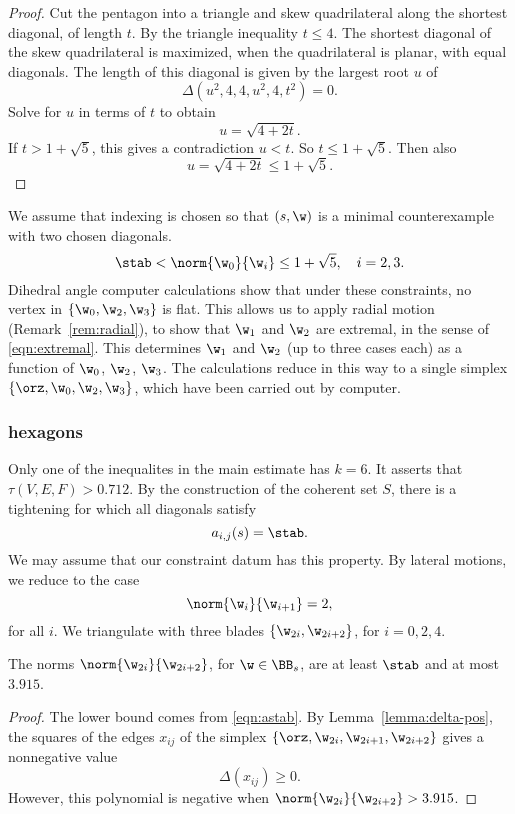 \begin{proof}
  Cut the pentagon into a triangle and skew quadrilateral along the
  shortest diagonal, of length $t$.  By the triangle inequality
  $t\le4$.  The shortest diagonal of the skew quadrilateral is
  maximized, when the quadrilateral is planar, with equal diagonals.
  The length of this diagonal is given by the largest root $u$ of
\[
\Delta(u^2,4,4,u^2,4,t^2)=0.
\]
Solve for $u$ in terms of $t$ to obtain
\[
u = \sqrt{4 + 2 t}.
\]
If $t>1+\sqrt{5}$, this gives a contradiction $u<t$.  
So $t\le 1+\sqrt{5}$.
Then also
\[
u = \sqrt{4 + 2t} \le 1+\sqrt{5}.
\]
\end{proof}


We assume that indexing is chosen so that $(s,\w)$ is a minimal
counterexample with two chosen diagonals.
\[
\stab < \norm{\w_0}{\w_i} \le 1+\sqrt{5},\quad i=2,3.
\]
Dihedral angle computer calculations show that under these
constraints, no vertex in $\{\w_0,\w_2,\w_3\}$ is flat.  This allows
us to apply radial motion (Remark~\ref{rem:radial}), to show that
$\w_1$ and $\w_2$ are extremal, in the sense of \eqref{eqn:extremal}.
This determines $\w_1$ and $\w_2$ (up to three cases each) as a
function of $\w_0$, $\w_2$, $\w_3$.  The calculations reduce in this
way to a single simplex $\{\orz,\w_0,\w_2,\w_3\}$, which have been
carried out by computer.

\subsubsection{hexagons}

Only one of the inequalites in the main estimate has $k=6$.  It
asserts that $\tau(V,E,F) > 0.712$.  By the construction of the
coherent set $S$, there is a tightening for which all diagonals
satisfy
\begin{equation}\label{eqn:astab}
a_{i,j}(s)=\stab.
\end{equation}  
We may assume that our constraint datum
has this property.
By lateral motions, we reduce to the case
\[
\norm{\w_i}{\w_{i+1}}=2,
\]
for all $i$.  We triangulate with three blades
$\{\w_{2i},\w_{2i+2}\}$, for $i=0,2,4$.

\begin{lemma}
The norms $\norm{\w_{2i}}{\w_{2i+2}}$, for $\w\in \BB_s$, 
are at least $\stab$ and at most $3.915$.
\end{lemma}

\begin{proof}
  The lower bound comes from \eqref{eqn:astab}.  By
  Lemma~\ref{lemma:delta-pos}, the squares of the edges $x_{ij}$ of
  the simplex $\{\orz,\w_{2i},\w_{2i+1},\w_{2i+2}\}$ gives a
  nonnegative value
\[
\Delta(x_{ij})\ge 0.
\]
However, this polynomial is  negative when
$\norm{\w_{2i}}{\w_{2i+2}} > 3.915$.
\end{proof}

